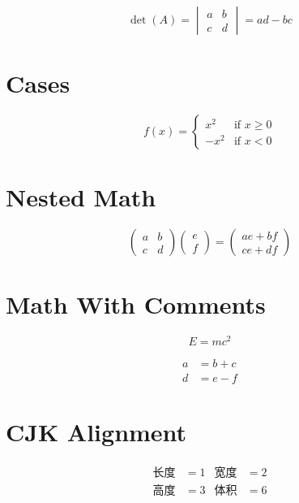 \documentclass{article}
\begin{document}
\begin{equation}
  \det(A) =
  \begin{vmatrix}
    a & b \\
    c & d
  \end{vmatrix} = ad - bc
\end{equation}

\section{Cases}
\begin{equation}
  f(x) =
  \begin{cases}
    x^{2}  & \text{if } x \geq 0 \\
    -x^{2} & \text{if } x < 0
  \end{cases}
\end{equation}

\section{Nested Math}
\begin{equation}
  \begin{pmatrix}
    a & b \\
    c & d
  \end{pmatrix}
  \begin{pmatrix}
    e \\
    f
  \end{pmatrix}
  =
  \begin{pmatrix}
    ae + bf \\
    ce + df
  \end{pmatrix}
\end{equation}

\section{Math With Comments}
\begin{equation}
  E = mc^{2} %
\end{equation}

\begin{align}
  a & = b + c \\
  d & = e - f %
\end{align}

\section{CJK Alignment}
\begin{align}
  长度 & = 1 & 宽度 & = 2 \\
  高度 & = 3 & 体积 & = 6
\end{align}
\end{document}
